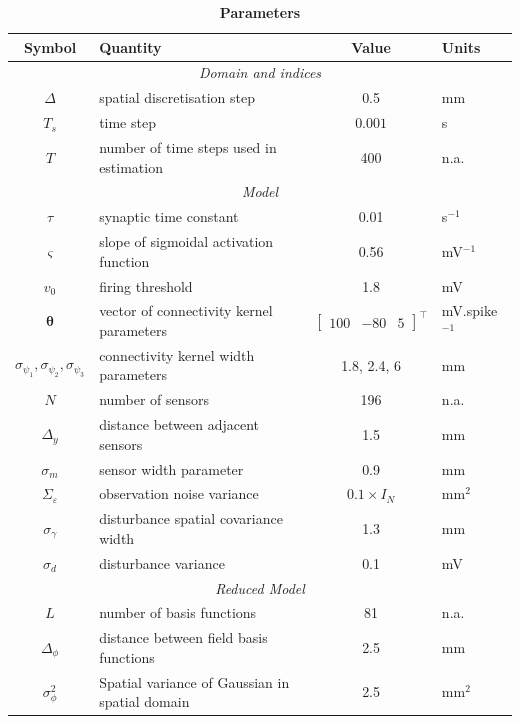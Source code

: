 \documentclass[12pt]{iopart}
\begin{document}
\begin{table}[!ht]
\caption{
\bf{Parameters}}
\begin{tabular}{|c|l|c|l|}
	\hline
	\textbf{Symbol} & \textbf{Quantity} & \textbf{Value} & \textbf{Units}\\
	\hline
	\multicolumn{4}{|c|}{\emph{Domain and indices}}\\
	\hline
	$\Delta$ & spatial discretisation step & 0.5 & mm \\
	$T_s$ & time step & $0.001$ & s\\
	$T$ & number of time steps used in estimation & 400 & n.a.\\
	\hline 
\multicolumn{4}{|c|}{\emph{Model}}\\
	\hline
	$\tau$ & synaptic time constant & 0.01 & s$^{-1}$ \\
	$\varsigma$ & slope of sigmoidal activation function & 0.56 & mV$^{-1}$\\
	$v_0$ & firing threshold & 1.8 \cite{Marreiros2008}& mV  \\
	$\boldsymbol{\theta}$ & vector of connectivity kernel parameters & $\left[\begin{array}{ccc}
	100 &-80 &5
	\end{array}
	\right]^{\top}$ & mV.spike$^{-1}$\\
	$\sigma_{\psi_{1}}, \sigma_{\psi_{2}}, \sigma_{\psi_{3}}$ & connectivity kernel width parameters & 1.8, 2.4, 6 & mm\\
	$N$ & number of sensors & 196 & n.a.\\ 
	$\Delta_y$ & distance between adjacent sensors & 1.5 & mm\\
	$\sigma_{m}$ & sensor width parameter & 0.9 & mm \\
	$\Sigma_{\varepsilon}$ & observation noise variance & $0.1 \times I_{N}$ & mm$^2$ \\
	$\sigma_{\gamma}$& disturbance spatial covariance width & 1.3 & mm\\
	$\sigma_{d}$ & disturbance variance & 0.1 & mV \\
	\hline 
	\multicolumn{4}{|c|}{\emph{Reduced Model}}\\
	\hline
	$L$ & number of basis functions& 81 & n.a.\\
	$\Delta_{\phi}$ & distance between field basis functions & 2.5 & mm \\
	$\sigma^2_{\phi}$ & Spatial variance of Gaussian in spatial domain & 2.5 & mm$^2$\\

\end{tabular}
\end{table}
\end{document}
